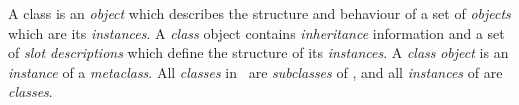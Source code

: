 \begin{optDefinition}
\begin{definitions}
     A class is an {\em object} which
    describes the structure and behaviour of a set of {\em objects} which are
    its {\em instances}.  A {\em class} object contains {\em inheritance}
    information and a set of {\em slot descriptions} which define the structure
    of its {\em instances}.  A {\em class} {\em object} is an {\em instance} of
    a {\em metaclass}.  All {\em classes} in \eulisp\ are {\em subclasses} of
    {}, and all {\em instances} of {} are {\em classes}.



\end{definitions}
\end{optDefinition}
